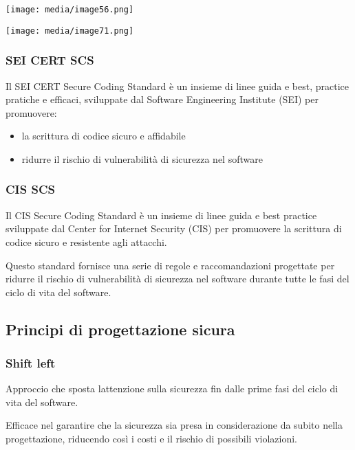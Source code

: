 \texttt{[image: media/image56.png]}

\texttt{[image: media/image71.png]}

\subsubsection{SEI CERT SCS}\label{sei-cert-scs}

Il SEI CERT Secure Coding Standard è un insieme di linee guida e best,
practice pratiche e efficaci, sviluppate dal Software Engineering
Institute (SEI) per promuovere:

\begin{itemize}
\item
  la scrittura di codice sicuro e affidabile
\item
  ridurre il rischio di vulnerabilità di sicurezza nel software
\end{itemize}

\subsubsection{CIS SCS}\label{cis-scs}

Il CIS Secure Coding Standard è un insieme di linee guida e best
practice sviluppate dal Center for Internet Security (CIS) per
promuovere la scrittura di codice sicuro e resistente agli attacchi.

Questo standard fornisce una serie di regole e raccomandazioni
progettate per ridurre il rischio di vulnerabilità di sicurezza nel
software durante tutte le fasi del ciclo di vita del software.

\subsection{Principi di progettazione
sicura}\label{principi-di-progettazione-sicura}

\subsubsection{Shift left}\label{shift-left}

Approccio che sposta l\textquotesingle attenzione sulla sicurezza fin
dalle prime fasi del ciclo di vita del software.

Efficace nel garantire che la sicurezza sia presa in considerazione da
subito nella progettazione, riducendo così i costi e il rischio di
possibili violazioni.

